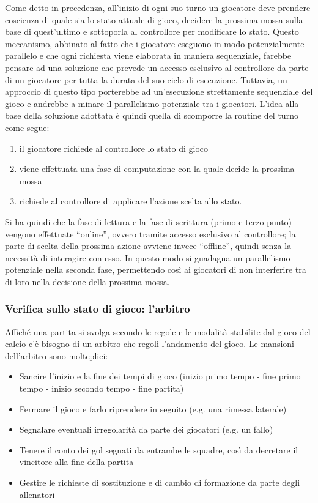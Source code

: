 Come detto in precedenza, all'inizio di ogni suo turno un giocatore deve prendere coscienza di quale sia lo stato attuale di gioco, decidere la prossima mossa sulla base di quest'ultimo e sottoporla al controllore per modificare lo stato. Questo meccanismo, abbinato al fatto che i giocatore eseguono in modo potenzialmente parallelo e che ogni richiesta viene elaborata in maniera sequenziale, farebbe pensare ad una soluzione che prevede un accesso esclusivo al controllore da parte di un giocatore per tutta la durata del suo ciclo di esecuzione. Tuttavia, un approccio di questo tipo porterebbe ad un'esecuzione strettamente sequenziale del gioco e andrebbe a minare il parallelismo potenziale tra i giocatori. L'idea alla base della soluzione adottata è quindi quella di scomporre la routine del turno come segue:\\

\begin{enumerate}
	\item il giocatore richiede al controllore lo stato di gioco
	\item viene effettuata una fase di computazione con la quale decide la prossima mossa
	\item richiede al controllore di applicare l'azione scelta allo stato.
\end{enumerate}

Si ha quindi che la fase di lettura e la fase di scrittura (primo e terzo punto) vengono effettuate “online”, ovvero tramite accesso esclusivo al controllore; la parte di scelta della prossima azione avviene invece “offline”, quindi senza la necessità di interagire con esso. In questo modo si guadagna un parallelismo potenziale nella seconda fase, permettendo così ai giocatori di non interferire tra di loro nella decisione della prossima mossa.

\subsubsection{Verifica sullo stato di gioco: l'arbitro}
\label{sec:modello_verifica_arbitro}

Affiché una partita si svolga secondo le regole e le modalità stabilite dal gioco del calcio c'è bisogno di un arbitro che regoli l'andamento del gioco. Le mansioni dell'arbitro sono molteplici:

\begin{itemize}
	\item Sancire l'inizio e la fine dei tempi di gioco (inizio primo tempo - fine primo tempo - inizio secondo tempo - fine partita)
	\item Fermare il gioco e farlo riprendere in seguito (e.g. una rimessa laterale)
	\item Segnalare eventuali irregolarità da parte dei giocatori (e.g. un fallo)
	\item Tenere il conto dei gol segnati da entrambe le squadre, così da decretare il vincitore alla fine della partita
	\item Gestire le richieste di sostituzione e di cambio di formazione da parte degli allenatori
\end{itemize}


